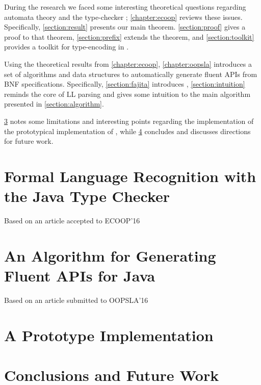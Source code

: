 \documentclass[12pt]{book}
\begin{document}
During the research we faced some interesting theoretical questions regarding
automata theory and the \Java type-checker ; \cref{chapter:ecoop} reviews
these issues. Specifically, \cref{section:result} presents our main theorem.
\cref{section:proof} gives a proof to that theorem, \cref{section:prefix}
extends the theorem, and \cref{section:toolkit} provides a toolkit for type-encoding
in \Java.

Using the theoretical results from \cref{chapter:ecoop}, \cref{chapter:oopsla}
introduces a set of algorithms and data structures to automatically generate
fluent APIs from BNF specifications. Specifically,
\cref{section:fajita} introduces \Fajita, \cref{section:intuition}
reminds the core of LL parsing and gives some intuition to the main algorithm
presented in \cref{section:algorithm}.

\cref{chapter:prototype} notes some limitations and interesting points
regarding the implementation of the prototypical implementation of \Fajita,
while \cref{chapter:conclusions} concludes and discusses directions for future
work.

\chapter{Formal Language Recognition with the Java Type Checker}
\Large Based on an article accepted to ECOOP'16~\cite{Gil:Levy:2016}
\label{chapter:ecoop}
\normalsize


\chapter{An Algorithm for Generating Fluent APIs for Java}
\Large Based on an article submitted to OOPSLA'16~\cite{Gil:Levy:2016a}
\label{chapter:oopsla}
\normalsize


\chapter{A Prototype Implementation}
\label{chapter:prototype}


\chapter{Conclusions and Future Work}
\label{chapter:conclusions}






\cleartoleftpage
{}
%

\end{document}
